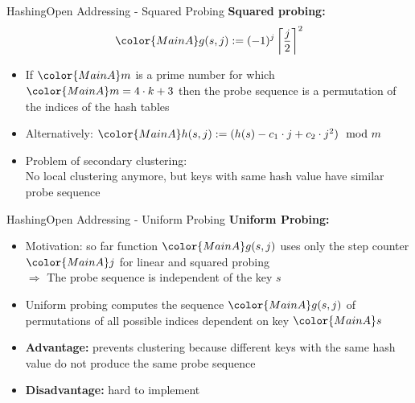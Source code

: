 
\begin{frame}{Hashing}{Open Addressing - Squared Probing}
  \textbf{Squared probing:}
  \begin{displaymath}
    {\color{MainA}g(s,j)
    := (-1)^j
    \left\lceil \frac{j}{2} \right\rceil^2}
  \end{displaymath}
  \vspace{-1.0em}
  \begin{itemize}
    \item<2->
      If ${\color{MainA}m}$ is a prime number for which
      \begin{math}
        {\color{MainA}m = 4 \cdot k + 3}
      \end{math}
      then the probe sequence is a permutation of the indices of
      the hash tables
   \item<3->
      Alternatively:
      \begin{math}
        {\color{MainA}h(s,j) := (h(s) - c_1 \cdot j + c_2 \cdot j^2) \mod m}
      \end{math}
    \item<4->
      Problem of secondary clustering:\\
      No local clustering anymore, but keys with same hash value
      have similar probe sequence
  \end{itemize}
\end{frame}


\begin{frame}{Hashing}{Open Addressing - Uniform Probing}
  \textbf{Uniform Probing:}
  \begin{itemize}
    \item<2->
      Motivation: so far function ${\color{MainA}g(s,j)}$  uses only the step
      counter ${\color{MainA}j}$ for linear and squared probing\\
      {\color{red}$\Rightarrow$ The probe sequence is independent of the key
        $s$}
    \item<3->
      Uniform probing computes the sequence ${\color{MainA}g(s,j)}$ of permutations of all possible indices dependent on key ${\color{MainA}s}$ 
    \item<4->
      \textbf{Advantage:}
      prevents clustering because different keys with the same hash
      value do not produce the same probe sequence
    \item<5->
      \textbf{Disadvantage:}
      hard to implement
  \end{itemize}
\end{frame}

